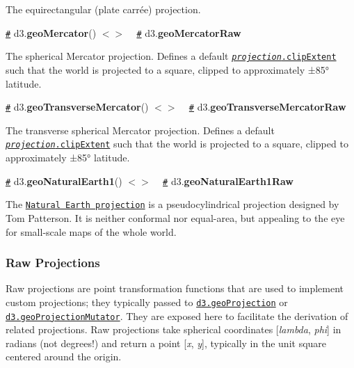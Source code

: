 The equirectangular (plate carrée) projection.

\href{#geoMercator}{\tt \#} d3.{\bfseries geo\+Mercator}() \href{https://github.com/d3/d3-geo/blob/master/src/projection/mercator.js}{\tt $<$$>$} ~\newline
\href{#geoMercatorRaw}{\tt \#} d3.{\bfseries geo\+Mercator\+Raw}

\href{https://bl.ocks.org/mbostock/3757132}{\tt }

The spherical Mercator projection. Defines a default \href{#projection_clipExtent}{\tt {\itshape projection}.clip\+Extent} such that the world is projected to a square, clipped to approximately ±85° latitude.

\href{#geoTransverseMercator}{\tt \#} d3.{\bfseries geo\+Transverse\+Mercator}() \href{https://github.com/d3/d3-geo/blob/master/src/projection/transverseMercator.js}{\tt $<$$>$} ~\newline
\href{#geoTransverseMercatorRaw}{\tt \#} d3.{\bfseries geo\+Transverse\+Mercator\+Raw}

\href{https://bl.ocks.org/mbostock/4695821}{\tt }

The transverse spherical Mercator projection. Defines a default \href{#projection_clipExtent}{\tt {\itshape projection}.clip\+Extent} such that the world is projected to a square, clipped to approximately ±85° latitude.

\href{#geoNaturalEarth1}{\tt \#} d3.{\bfseries geo\+Natural\+Earth1}() \href{https://github.com/d3/d3-geo/blob/master/src/projection/naturalEarth1.js}{\tt $<$$>$} ~\newline
\href{#geoNaturalEarth1Raw}{\tt \#} d3.{\bfseries geo\+Natural\+Earth1\+Raw}

\href{https://bl.ocks.org/mbostock/4479477}{\tt }

The \href{http://www.shadedrelief.com/NE_proj/}{\tt Natural Earth projection} is a pseudocylindrical projection designed by Tom Patterson. It is neither conformal nor equal-\/area, but appealing to the eye for small-\/scale maps of the whole world.

\subsubsection*{Raw Projections}

Raw projections are point transformation functions that are used to implement custom projections; they typically passed to \href{#geoProjection}{\tt d3.\+geo\+Projection} or \href{#geoProjectionMutator}{\tt d3.\+geo\+Projection\+Mutator}. They are exposed here to facilitate the derivation of related projections. Raw projections take spherical coordinates \mbox{[}{\itshape lambda}, {\itshape phi}\mbox{]} in radians (not degrees!) and return a point \mbox{[}{\itshape x}, {\itshape y}\mbox{]}, typically in the unit square centered around the origin.

